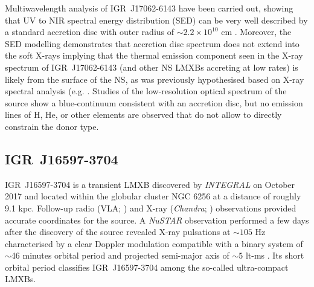 \documentclass[graybox]{svmult}
\def \inte {{\em INTEGRAL\xspace}}
\def \chandra {{\em Chandra\xspace}}
\def \nustar{{\em NuSTAR\xspace}}
\begin{document}
Multiwavelength analysis of IGR~J17062-6143 have been carried out, showing that UV to NIR spectral energy distribution (SED) can be very well described by a standard accretion disc with outer radius of $\sim2.2\times10^{10}$ cm \cite{HernandezSantisteban2019}. Moreover, the SED modelling demonstrates that accretion disc spectrum does not extend into the soft X-rays implying that the thermal emission component seen in the X-ray spectrum of IGR~J17062-6143 (and other NS LMXBs accreting at low rates) is likely from the surface of the NS, as was previously hypothesised based on X-ray spectral analysis (e.g. \cite{ArmasPadilla2013,Degenaar2017}. Studies of the low-resolution optical spectrum of the source show a blue-continuum consistent with an accretion disc, but no emission lines of H, He, or other elements are observed that do not allow to directly constrain the donor type.

\subsection{IGR~J16597-3704}

IGR~J16597-3704 is a transient LMXB discovered by \inte{} on October 2017 \cite{Bozzo2017} and located within the globular cluster NGC 6256 at a distance of roughly 9.1 kpc. Follow-up radio (VLA; \cite{Tetarenko2017}) and X-ray (\chandra{}; \cite{Chakrabarty2017}) observations provided accurate coordinates for the source. 
A \nustar{} observation performed a few days after the discovery of the source revealed X-ray pulsations at $\sim 105$ Hz characterised by a clear Doppler modulation compatible with a binary system of $\sim$46 minutes orbital period and projected semi-major axis of $\sim5$ lt-ms \cite{Sanna2018a}. Its short orbital period classifies IGR~J16597-3704 among the so-called ultra-compact LMXBs. 
\end{document}
